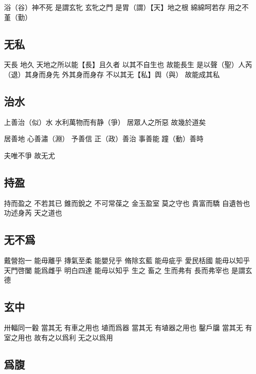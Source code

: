 \documentclass[a5paper,zihao=-4,oneside,UTF8]{ctexart}
\begin{document}
浴（谷）神不死 是謂玄牝 
玄牝之門 是胃（謂）【天】地之根 
綿綿呵若存 用之不堇（勤）



\subsection{无私}



天長 地久 天地之所以能【長】且久者 以其不自生也 故能長生 
是以聲（聖）人芮（退）其身而身先 外其身而身存 
不以其无【私】舆（與） 故能成其私 



\subsection{治水}


上善治（似）水 水利萬物而有静（爭） 居眾人之所惡 故幾於道矣

居善地 心善潚（淵） 予善信 正（政）善治 事善能 蹱（動）善時

夫唯不爭 故无尤



\subsection{持盈}



持而盈之 不若其已 
錐而銳之 不可常葆之 
金玉盈室 莫之守也 
貴富而驕 自遺咎也 
功述身芮 天之道也 



\subsection{无不爲}



戴營抱一 能毋離乎  摶氣至柔 能嬰兒乎  
脩除玄藍 能毋疵乎 愛民栝國 能毋以知乎 
天門啓闔 能爲雌乎 明白四達 能毋以知乎 
生之 畜之 生而弗有 長而弗宰也 是謂玄德 



\subsection{玄中}



卅輻同一轂 當其无 有車之用也 
埴而爲器 當其无 有埴器之用也 
鑿戶牖 當其无 有室之用也 
故有之以爲利 无之以爲用 



\subsection{爲腹}
\end{document}
